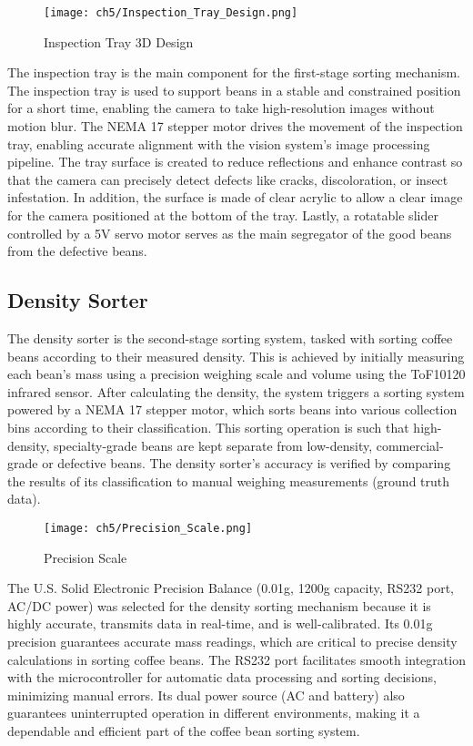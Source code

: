 \begin{figure}[H]
    \centering
    \texttt{[image: ch5/Inspection\_Tray\_Design.png]}
    \caption{Inspection Tray 3D Design}
    \label{fig:inspection_tray_design}
\end{figure}
The inspection tray is the main component for the first-stage sorting mechanism. The inspection tray is used to support beans in a stable and constrained position for a short time, enabling the camera to take high-resolution images without motion blur. The NEMA 17 stepper motor drives the movement of the inspection tray, enabling accurate alignment with the vision system's image processing pipeline. The tray surface is created to reduce reflections and enhance contrast so that the camera can precisely detect defects like cracks, discoloration, or insect infestation. In addition, the surface is made of clear acrylic to allow a clear image for the camera positioned at the bottom of the tray. Lastly, a rotatable slider controlled by a 5V servo motor serves as the main segregator of the good beans from the defective beans. 

\subsection{Density Sorter}
\label{sec:density_sorter}

The density sorter is the second-stage sorting system, tasked with sorting coffee beans according to their measured density. This is achieved by initially measuring each bean's mass using a precision weighing scale and volume using the ToF10120 infrared sensor. After calculating the density, the system triggers a sorting system powered by a NEMA 17 stepper motor, which sorts beans into various collection bins according to their classification. This sorting operation is such that high-density, specialty-grade beans are kept separate from low-density, commercial-grade or defective beans. The density sorter's accuracy is verified by comparing the results of its classification to manual weighing measurements (ground truth data).

\begin{figure}[H]
    \centering
    \texttt{[image: ch5/Precision\_Scale.png]}
    \caption{Precision Scale}
    \label{fig:precision_scale}
\end{figure}
The U.S. Solid Electronic Precision Balance (0.01g, 1200g capacity, RS232 port, AC/DC power) was selected for the density sorting mechanism because it is highly accurate, transmits data in real-time, and is well-calibrated. Its 0.01g precision guarantees accurate mass readings, which are critical to precise density calculations in sorting coffee beans. The RS232 port facilitates smooth integration with the microcontroller for automatic data processing and sorting decisions, minimizing manual errors. Its dual power source (AC and battery) also guarantees uninterrupted operation in different environments, making it a dependable and efficient part of the coffee bean sorting system.



